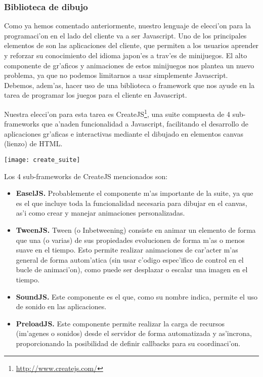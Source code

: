 \subsubsection[Biblioteca de dibujo (SBP)]{Biblioteca de dibujo}
\label{sub:biblioteca_de_dibujo}

Como ya hemos comentado anteriormente, nuestro lenguaje de elecci'on para la programaci'on en el
lado del cliente va a ser Javascript. 
Uno de los principales elementos de \Nipponline{} son las aplicaciones del cliente, que permiten a
los usuarios aprender y reforzar su conocimiento del idioma japon'es a trav'es de minijuegos. El
alto componente de gr'aficos y animaciones de estos minijuegos nos plantea un nuevo problema, ya
que no podemos limitarnos a usar simplemente Javascript. Debemos, adem'as, hacer uso de una
biblioteca o framework que nos ayude en la tarea de programar los juegos para el cliente en
Javascript.

Nuestra elecci'on para esta tarea es CreateJS\footnote{\url{http://www.createjs.com/}}, una suite compuesta de 4 
sub-frameworks que a'naden funcionalidad a Javascript, facilitando el desarrollo de aplicaciones
gr'aficas e interactivas mediante el dibujado en elementos canvas (lienzo) de HTML.

\begin{center}
\texttt{[image: create\_suite]}
\end{center}

Los 4 sub-frameworks de CreateJS mencionados son:

\begin{itemize}
\item \textbf{EaselJS.} Probablemente el componente m'as importante de la suite, ya que es el que incluye
toda la funcionalidad necesaria para dibujar en el canvas, as'i como crear y manejar animaciones
personalizadas.
\item \textbf{TweenJS.} Tween (o Inbetweening) consiste en animar un elemento de forma que una (o varias)
de sus propiedades evolucionen de forma m'as o menos suave en el tiempo. Esto permite realizar
animaciones de car'acter m'as general de forma autom'atica (sin usar c'odigo espec'ifico de 
control en el bucle de animaci'on), como puede ser desplazar o escalar una imagen en el tiempo.
\item \textbf{SoundJS.} Este componente es el que, como su nombre indica, permite el uso de sonido en las
aplicaciones.
\item \textbf{PreloadJS.} Este componente permite realizar la carga de recursos (im'agenes o sonidos) desde
el servidor de forma automatizada y as'incrona, proporcionando la posibilidad de definir callbacks
para su coordinaci'on.
\end{itemize}

